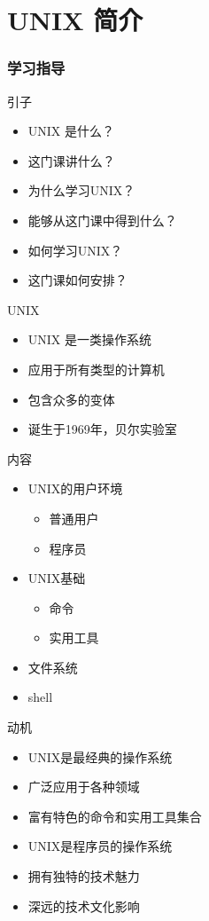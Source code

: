 \part{UNIX 简介}
\section{学习指导}
\begin{frame}{引子}
\begin{itemize}
  \item UNIX 是什么？
  \item 这门课讲什么？
  \item 为什么学习UNIX？
  \item 能够从这门课中得到什么？
  \item 如何学习UNIX？
  \item 这门课如何安排？
\end{itemize}
\end{frame}

\begin{frame}{UNIX}
\begin{itemize}
  \item UNIX 是一类操作系统
  \item 应用于所有类型的计算机
  \item 包含众多的变体
  \item 诞生于1969年，贝尔实验室
\end{itemize}
\end{frame}

\begin{frame}{内容}
\begin{itemize}
  \item UNIX的用户环境
  \begin{itemize}
    \item 普通用户
    \item 程序员
  \end{itemize}
  \item UNIX基础
    \begin{itemize}
      \item 命令
      \item 实用工具
    \end{itemize}
  \item 文件系统
  \item shell
\end{itemize}
\end{frame}

\begin{frame}{动机}
\begin{itemize}
  \item UNIX是最经典的操作系统
  \item 广泛应用于各种领域
  \item 富有特色的命令和实用工具集合
  \item UNIX是程序员的操作系统
  \item 拥有独特的技术魅力
  \item 深远的技术文化影响
\end{itemize}
\end{frame}

